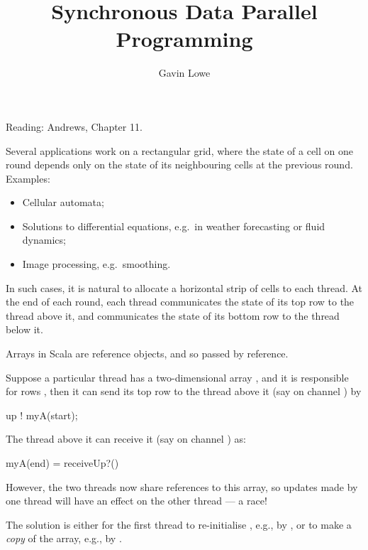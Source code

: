 \documentclass[notes,color]{sepslide0}
\title{Synchronous Data Parallel Programming}
\author{Gavin Lowe}
\begin{document}
\begin{slide}
  
  \Title

Reading: Andrews, Chapter 11.
\end{slide}





\begin{slide}

Several applications work on a rectangular grid, where the state of a cell on
one round depends only on the state of its neighbouring cells at the previous
round.  Examples:
%
\begin{itemize}
\item
Cellular automata;

\item
Solutions to differential equations, e.g.~in weather forecasting or fluid
dynamics;

\item Image processing, e.g.~smoothing.
\end{itemize}

In such cases, it is natural to allocate a horizontal strip of cells to each
thread.  At the end of each round, each thread communicates the state of its
top row to the thread above it, and communicates the state of its bottom row
to the thread below it.  

\end{slide}


\begin{slide}

Arrays in Scala are reference objects, and so passed by reference.  

Suppose a particular thread has a two-dimensional array , and it
is responsible for rows \SCALA{[start..end)}, then it can send its top row to
the thread above it (say on channel ) by
%
\begin{scala}
up ! myA(start);
\end{scala}
%
The thread above it can receive it (say on channel ) as:
%
\begin{scala}
myA(end) = receiveUp?()
\end{scala}
%
However, the two threads now share references to this array, so updates made
by one thread will have an effect on the other thread --- a race!

The solution is either for the first thread to re-initialise
, e.g., by , or to
make a \emph{copy} of the array, e.g., by .
\end{slide}
\end{document}
